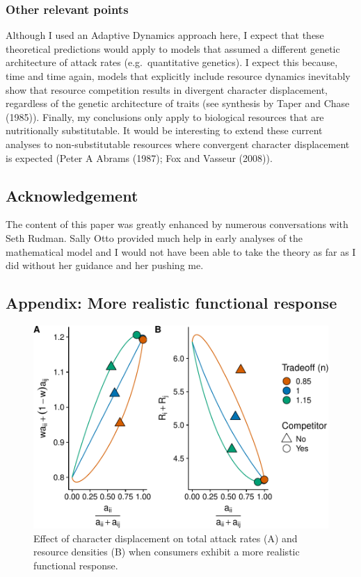 \documentclass[11pt,]{article}
\begin{document}
\subsubsection{Other relevant points}\label{other-relevant-points}

Although I used an Adaptive Dynamics approach here, I expect that these
theoretical predictions would apply to models that assumed a different
genetic architecture of attack rates (e.g.~quantitative genetics). I
expect this because, time and time again, models that explicitly include
resource dynamics inevitably show that resource competition results in
divergent character displacement, regardless of the genetic architecture
of traits (see synthesis by Taper and Chase (1985)). Finally, my
conclusions only apply to biological resources that are nutritionally
substitutable. It would be interesting to extend these current analyses
to non-substitutable resources where convergent character displacement
is expected (Peter A Abrams (1987); Fox and Vasseur (2008)).

\subsection{Acknowledgement}\label{acknowledgement}

The content of this paper was greatly enhanced by numerous conversations
with Seth Rudman. Sally Otto provided much help in early analyses of the
mathematical model and I would not have been able to take the theory as
far as I did without her guidance and her pushing me.

\subsection{Appendix: More realistic functional
response}\label{appendix-more-realistic-functional-response}

\begin{figure}
\centering
\includegraphics{ECD_Supp_Mat_files/figure-latex/McCann_Resources-1.pdf}
\caption{\label{fig:McCann_Resources}Effect of character displacement on
total attack rates (A) and resource densities (B) when consumers exhibit
a more realistic functional response.}
\end{figure}
\end{document}
